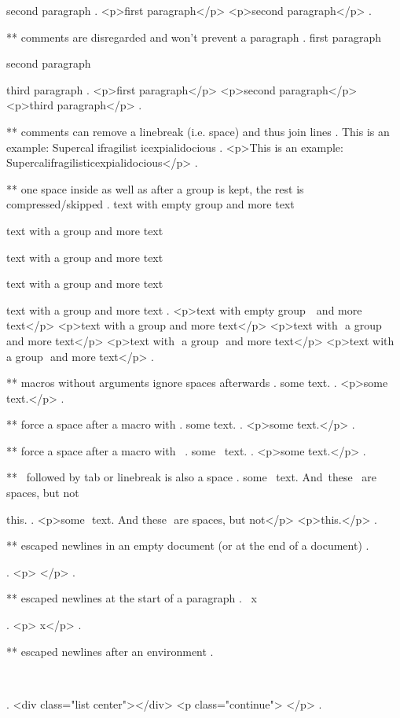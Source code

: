 second paragraph
.
<p>ﬁrst paragraph</p>
<p>second paragraph</p>
.

** comments are disregarded and won't prevent a paragraph
.
first paragraph %

second paragraph%

third paragraph
.
<p>ﬁrst paragraph</p>
<p>second paragraph</p>
<p>third paragraph</p>
.


** comments can remove a linebreak (i.e. space) and thus join lines
.
This is an %
example: Supercal%
              ifragilist%
    icexpialidocious
.
<p>This is an example: Supercalifragilisticexpialidocious</p>
.



** one space inside as well as after a group is kept, the rest is compressed/skipped
.
text with empty group {  } and more text

text with {a group} and more text

text with { a group } and more text

text with { a group  } and more text

text with {  a group  }  and more text
.
<p>text with empty group ​ ​ and more text</p>
<p>text with a group​ and more text</p>
<p>text with ​ a group ​ and more text</p>
<p>text with ​ a group ​ and more text</p>
<p>text with ​ a group ​ and more text</p>
.


** macros without arguments ignore spaces afterwards
.
some \empty  text.
.
<p>some text.</p>
.


** force a space after a macro with {}
.
some \empty{} text.
.
<p>some ​ text.</p>
.


** force a space after a macro with \
.
some \empty\ text.
.
<p>some ​ text.</p>
.


** \ followed by tab or linebreak is also a space
.
some \empty\
text. And\	these
\
are spaces, but not\

this.
.
<p>some ​ text. And​ these ​ are spaces, but not​ </p>
<p>this.</p>
.


** escaped newlines in an empty document (or at the end of a document)
.
\


.
<p>​ </p>
.


** escaped newlines at the start of a paragraph
.
\
x

.
<p>​ x</p>
.


** escaped newlines after an environment
.
\begin{center}
\end{center}
\

.
<div class="list center"></div>
<p class="continue">​ </p>
.

